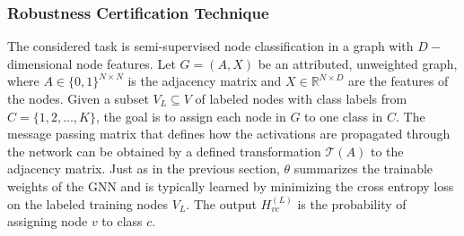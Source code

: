 \documentclass[a4paper,preprint]{sig-alternate}
\begin{document}
\subsubsection{Robustness Certification Technique}

The considered task is semi-supervised node classification in a graph with $D-$dimensional
node features. Let $G = (A, X)$ be an attributed, unweighted graph, where $A \in \{0, 1\}^{N \times N}$ is the
adjacency matrix and $X \in \mathbb{R}^{N \times D}$ are the features of the nodes. Given a subset $V_L \subseteq V$ of 
labeled nodes with class labels from $C = \{1, 2, ..., K\}$, the goal is to assign each node in $G$ to one class in $C$.
The message passing matrix that defines how the activations are propagated through the network can be obtained
by a defined transformation $\mathcal{T}(A)$ to the adjacency matrix. Just as in the previous section, $\theta$ summarizes the trainable weights of 
the GNN and is typically learned by minimizing the cross entropy loss on the labeled training nodes $V_L$. The output 
$H_{vc}^{(L)}$ is the probability of assigning node $v$ to class $c$.\newline
\end{document}
